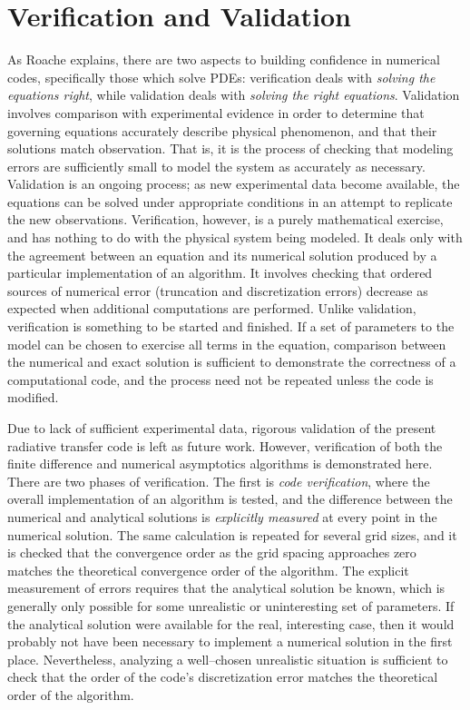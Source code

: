 \section{Verification and Validation}
\label{sec:v2}
As Roache explains, there are two aspects to building confidence in numerical codes, specifically those which solve PDEs:
verification deals with \textit{solving the equations right}, while validation deals with \textit{solving the right equations}.
Validation involves comparison with experimental evidence in order to determine that governing equations
accurately describe physical phenomenon, and that their solutions match observation.
That is, it is the process of checking that modeling errors are sufficiently small to model the system as accurately as necessary.
Validation is an ongoing process; as new experimental data become available, the equations can be solved under appropriate conditions in an attempt to replicate the new observations.
Verification, however, is a purely mathematical exercise, and has nothing to do with the physical system being modeled.
It deals only with the agreement between an equation and its numerical solution produced by a particular implementation of an algorithm.
It involves checking that ordered sources of numerical error (truncation and discretization errors) decrease as expected when additional computations are performed.
Unlike validation, verification is something to be started and finished.
If a set of parameters to the model can be chosen to exercise all terms in the equation, comparison between the numerical and exact solution is sufficient to demonstrate the correctness of a computational code, and the process need not be repeated unless the code is modified.

Due to lack of sufficient experimental data, rigorous validation of the present radiative transfer code is left as future work.
However, verification of both the finite difference and numerical asymptotics algorithms is demonstrated here.
There are two phases of verification.
The first is \textit{code verification}, where the overall implementation of an algorithm is tested, and the difference between the numerical and analytical solutions is \textit{explicitly measured} at every point in the numerical solution.
The same calculation is repeated for several grid sizes, and it is checked that the convergence order as the grid spacing approaches zero matches the theoretical convergence order of the algorithm.
The explicit measurement of errors requires that the analytical solution be known, which is generally only possible for some unrealistic or uninteresting set of parameters.
If the analytical solution were available for the real, interesting case, then it would probably not have been necessary to implement a numerical solution in the first place.
Nevertheless, analyzing a well--chosen unrealistic situation is sufficient to check that the order of the code's discretization error matches the theoretical order of the algorithm.

